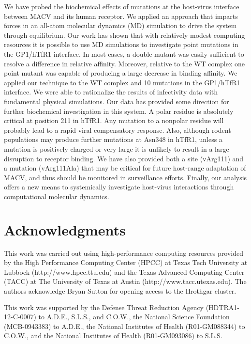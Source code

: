 \documentclass[12pt]{article}
\begin{document}
We have probed the biochemical effects of mutations at the host-virus interface between MACV and its human receptor. We applied an approach that imparts forces in an all-atom molecular dynamics (MD) simulation to drive the system through equilibrium. Our work has shown that with relatively modest computing resources it is possible to use MD simulations to investigate point mutations in the GP1/hTfR1 interface. In most cases, a double mutant was easily sufficient to resolve a difference in relative affinity. Moreover, relative to the WT complex one point mutant was capable of producing a large decrease in binding affinity. We applied our technique to the WT complex and 10 mutations in the GP1/hTfR1 interface. We were able to rationalize the results of infectivity data with fundamental physical simulations. Our data has provided some direction for further biochemical investigation in this system. A polar residue is absolutely critical at position 211 in hTfR1. Any mutation to a nonpolar residue will probably lead to a rapid viral compensatory response. Also, although rodent populations may produce further mutations at Asn348 in hTfR1, unless a mutation is positively charged or very large it is unlikely to result in a large disruption to receptor binding. We have also provided both a site (vArg111) and a mutation (vArg111Ala) that may be critical for future host-range adaptation of MACV, and thus should be monitored in surveillance efforts. Finally, our analysis offers a new means to systemically investigate host-virus interactions through computational molecular dynamics.

\section*{Acknowledgments}
This work was carried out using high-performance computing resources provided by the High Performance Computing Center (HPCC) at Texas Tech University at Lubbock (http://www.hpcc.ttu.edu) and the Texas Advanced Computing Center (TACC) at The University of Texas at Austin (http://www.tacc.utexas.edu). The authors acknowledge Bryan Sutton for opening access to the Hrothgar cluster.

This work was supported by the Defense Threat Reduction Agency (HDTRA1-12-C-0007) to A.D.E., S.L.S., and C.O.W., the National Science Foundation (MCB-0943383) to A.D.E., the National Institutes of Health (R01-GM088344) to C.O.W., and the National Institutes of Health (R01-GM093086) to S.L.S.



\end{document}
